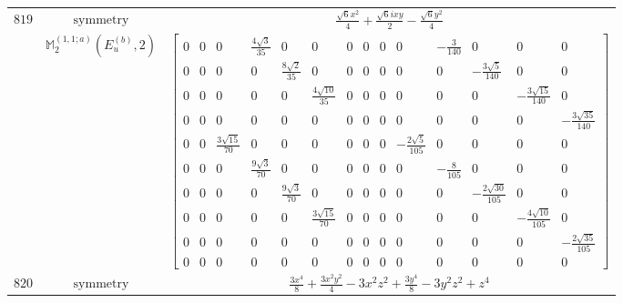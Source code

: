\documentclass[fleqn,8pt,landscape]{jsarticle}
\begin{document}
\begin{longtable}{ccc}
$ 819 $ & $ \text{symmetry} $ & $ \frac{\sqrt{6} x^{2}}{4} + \frac{\sqrt{6} i x y}{2} - \frac{\sqrt{6} y^{2}}{4} $ \\
$  $ & $ \mathbb{M}_{2}^{(1,1;a)}(E_{u}^{(b)},2) $ & $ \begin{bmatrix} 0 & 0 & 0 & \frac{4 \sqrt{3}}{35} & 0 & 0 & 0 & 0 & 0 & 0 & - \frac{3}{140} & 0 & 0 & 0 \\ 0 & 0 & 0 & 0 & \frac{8 \sqrt{2}}{35} & 0 & 0 & 0 & 0 & 0 & 0 & - \frac{3 \sqrt{5}}{140} & 0 & 0 \\ 0 & 0 & 0 & 0 & 0 & \frac{4 \sqrt{10}}{35} & 0 & 0 & 0 & 0 & 0 & 0 & - \frac{3 \sqrt{15}}{140} & 0 \\ 0 & 0 & 0 & 0 & 0 & 0 & 0 & 0 & 0 & 0 & 0 & 0 & 0 & - \frac{3 \sqrt{35}}{140} \\ 0 & 0 & \frac{3 \sqrt{15}}{70} & 0 & 0 & 0 & 0 & 0 & 0 & - \frac{2 \sqrt{5}}{105} & 0 & 0 & 0 & 0 \\ 0 & 0 & 0 & \frac{9 \sqrt{3}}{70} & 0 & 0 & 0 & 0 & 0 & 0 & - \frac{8}{105} & 0 & 0 & 0 \\ 0 & 0 & 0 & 0 & \frac{9 \sqrt{3}}{70} & 0 & 0 & 0 & 0 & 0 & 0 & - \frac{2 \sqrt{30}}{105} & 0 & 0 \\ 0 & 0 & 0 & 0 & 0 & \frac{3 \sqrt{15}}{70} & 0 & 0 & 0 & 0 & 0 & 0 & - \frac{4 \sqrt{10}}{105} & 0 \\ 0 & 0 & 0 & 0 & 0 & 0 & 0 & 0 & 0 & 0 & 0 & 0 & 0 & - \frac{2 \sqrt{35}}{105} \\ 0 & 0 & 0 & 0 & 0 & 0 & 0 & 0 & 0 & 0 & 0 & 0 & 0 & 0 \end{bmatrix} $ \\ \hline
$ 820 $ & $ \text{symmetry} $ & $ \frac{3 x^{4}}{8} + \frac{3 x^{2} y^{2}}{4} - 3 x^{2} z^{2} + \frac{3 y^{4}}{8} - 3 y^{2} z^{2} + z^{4} $ \\

\end{longtable}
\end{document}
